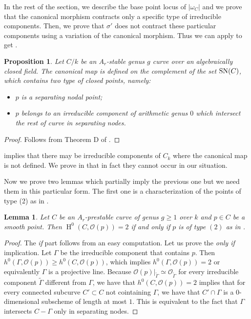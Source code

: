 \documentclass{alggeom}
\numberwithin{equation}{section}
\numberwithin{subsection}{section}
\newtheorem{proposition}[theorem]{Proposition}
\newtheorem{lemma}[theorem]{Lemma}
\theoremstyle{definition}
\theoremstyle{remark}
\newcommand\cO{\mathcal{O}} \newcommand\cP{\mathcal{P}}
\renewcommand\H{\operatorname{H}}
\begin{document}
In the rest of the section, we describe the base point locus of $|\omega_C|$ and we prove that the canonical morphism contracts only a specific type of irreducible components. Then, we prove that $\sigma'$ does not contract these particular components using a variation of the canonical morphism. Thus we can apply  to get . 

  
\begin{proposition}\label{prop:base-point-can}		
	Let $C/k$ be an $A_r$-stable genus $g$ curve over an algebraically closed field. The canonical map is defined on the complement of the set ${\rm SN}(C)$, which contains two type of closed points, namely:
	\begin{itemize}
		\item[$(1)$]   $p$ is a separating nodal point;
		\item[$(2)$]   $p$ belongs to an irreducible component of arithmetic genus $0$ which intersect the rest of curve in separating nodes.
	\end{itemize} 
\end{proposition} 
\begin{proof}
	Follows from Theorem D of \cite{Cat}.
\end{proof}

 implies that there may be irreducible components of $C_k$ where the canonical map is not defined. We prove in  that in fact they cannot occur in our situation.

Now we prove two lemmas which partially imply the previous one but we need them in this particular form. The first one is a characterization of the points of type (2) as in .

\begin{lemma}\label{lem:char-type2}
	Let $C$ be an $A_r$-prestable curve of genus $g\geq 1$ over $k$ and $p\in C$ be a smooth point. Then $\H^0(C,\cO(p))=2$ if and only if $p$ is of type $(2)$ as in .
\end{lemma}


\begin{proof}
	The \emph{if} part follows from an easy computation. Let us prove the \emph{only if} implication. Let $\Gamma$ be the irreducible component that contains $p$. Then $h^0(\Gamma,\cO(p))\geq h^0(C,\cO(p))$, which implies $h^0(\Gamma,\cO(p))=2$ or equivalently $\Gamma$ is a projective line. Because $\cO(p)\vert_{\tilde{\Gamma}}\simeq \cO_{\tilde{\Gamma}}$ for every irreducible component $\tilde{\Gamma}$ different from $\Gamma$, we have that $h^0(C,\cO(p))=2$ implies that for every connected subcurve $C'\subset C$ not cointaining $\Gamma$, we have that $C'\cap \Gamma$ is a $0$-dimensional subscheme of length at most $1$. This is equivalent to the fact that $\Gamma$ intersects $C-\Gamma$ only in separating nodes. 
\end{proof}
\end{document}
